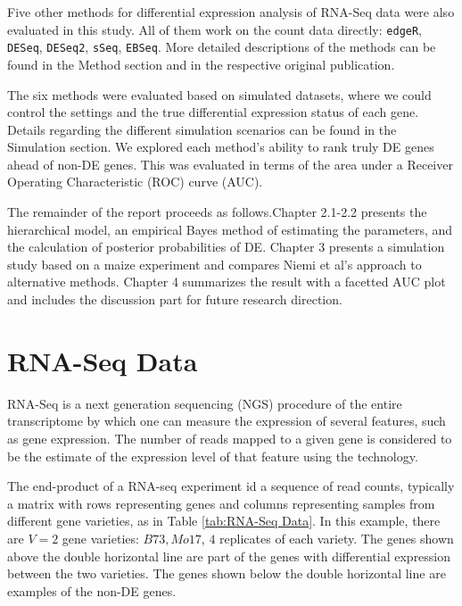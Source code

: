 Five other methods for differential expression analysis of RNA-Seq data were also evaluated in this study. All of them work on the count data directly: {\tt edgeR}\citep{robinson2010edger}, {\tt DESeq}\citep{anders2010differential}, {\tt DESeq2}\citep{love2014moderated}, {\tt sSeq}\citep{yu2013sseq}, {\tt EBSeq}\citep{leng2013ebseq}. More detailed descriptions of the methods can be found in the Method section and in the respective original publication. 

The six methods were evaluated based on simulated datasets, where we could control the settings and the true differential expression status of each gene. Details regarding the different simulation scenarios can be found in the Simulation section. We explored each method's ability to rank truly DE genes ahead of non-DE genes. This was evaluated in terms of the area under a Receiver Operating Characteristic (ROC) curve (AUC). 

The remainder of the report proceeds as follows.Chapter 2.1-2.2 presents the hierarchical model, an empirical Bayes method of estimating the parameters, and the calculation of posterior probabilities of DE. Chapter 3 presents a simulation study based on a maize experiment and compares Niemi et al's approach to alternative methods. Chapter 4 summarizes the result with a facetted AUC plot and includes the discussion part for future research direction. 


\section{RNA-Seq Data}

RNA-Seq is a next generation sequencing (NGS) procedure of the entire transcriptome by which one can measure the expression of several features, such as gene expression. The number of reads mapped to a given gene is considered to be the estimate of the expression level of that feature using the technology\citep{marioni2008rna}.

The end-product of a RNA-seq experiment id a sequence of read counts, typically a matrix with rows representing genes and columns representing samples from different gene varieties, as in Table \ref{tab:RNA-Seq Data}. In this example, there are $V=2$ gene varieties: $B73, Mo17$, $4$ replicates of each variety. The genes shown above the double horizontal line are part of the genes with differential expression between the two varieties. The genes shown below the double horizontal line are examples of the non-DE genes. 

